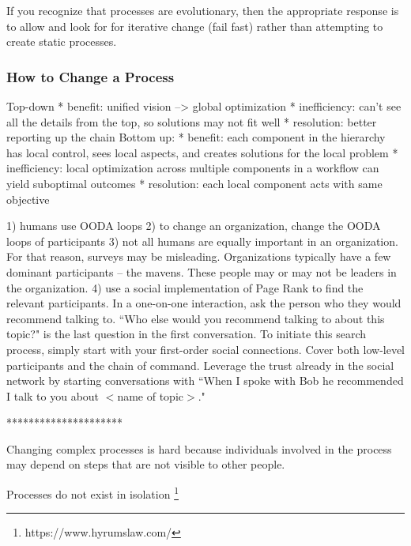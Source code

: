 If you recognize that processes are evolutionary, then the appropriate response is to allow and look for for iterative change (fail fast) rather than attempting to create static processes.

\subsubsection{How to Change a Process}
Top-down
* benefit: unified vision --> global optimization
* inefficiency: can't see all the details from the top, so solutions may not fit well
* resolution: better reporting up the chain
Bottom up:
* benefit: each component in the hierarchy has local control, sees local aspects, and creates solutions for the local problem
* inefficiency: local optimization across multiple components in a workflow can yield suboptimal outcomes
* resolution: each local component acts with same objective


1) humans use OODA loops
2) to change an organization, change the OODA loops of participants
3) not all humans are equally important in an organization. For that reason, surveys may be misleading. Organizations typically have a few dominant participants -- the mavens. These people may or may not be leaders in the organization.
4) use a social implementation of Page Rank to find the relevant participants. In a one-on-one interaction, ask the person who they would recommend talking to.
``Who else would you recommend talking to about this topic?" is the last question in the first conversation.
To initiate this search process, simply start with your first-order social connections. Cover both low-level participants and the chain of command.
Leverage the trust already in the social network by starting conversations with ``When I spoke with Bob he recommended I talk to you about $<$name of topic$>$."





*********************

Changing complex processes is hard because individuals involved in the process may depend on steps that are not visible to other people.


Processes do not exist in isolation
\footnote{https://www.hyrumslaw.com/} %
